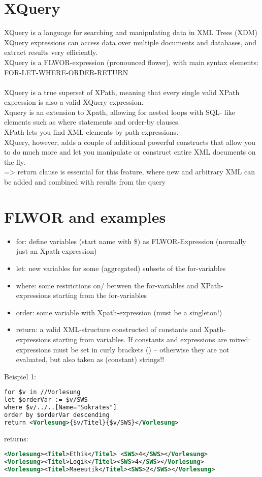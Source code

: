 \section{XQuery}
XQuery is a language for searching and manipulating data in XML Trees (XDM)\\
XQuery expressions can access data over multiple documents and databases, and extract results very efficiently.\\
XQuery is a FLWOR-expression (pronounced flower), with main syntax elements:\\FOR-LET-WHERE-ORDER-RETURN\\
\\
XQuery is a true superset of XPath, meaning that every single valid
XPath expression is also a valid XQuery expression.\\
Xquery is an extension to Xpath, allowing for nested loops with SQL- like elements such as where statements and order-by clauses.\\
XPath lets you find XML elements by path expressions.\\
XQuery, however, adds a couple of additional powerful constructs that allow you to do much more and let you manipulate or construct entire XML documents on the fly.\\
  => return clause is essential for this feature, where new and arbitrary XML can be added and combined with results from the query

\section{FLWOR and examples}

\begin{itemize}
  \item for: define variables (start name with \$) as FLWOR-Expression
(normally just an Xpath-expression)
  \item let: new variables for some (aggregated) subsets of the for-variables
  \item where: some restrictions on/ between the for-variables and XPath- expressions starting from the for-variables
  \item order: some variable with Xpath-expression (must be a singleton!)
  \item return: a valid XML-structure constructed of constants and Xpath- expressions starting from variables. If constants and expressions are mixed: expressions must be set in curly brackets ({}) – otherwise they are not evaluated, but also taken as (constant) strings!!
\end{itemize}
Beispiel 1:
\begin{lstlisting}[language=XML]
for $v in //Vorlesung
let $orderVar := $v/SWS
where $v/../..[Name="Sokrates"]
order by $orderVar descending
return <Vorlesung>{$v/Titel}{$v/SWS}</Vorlesung>
\end{lstlisting}
returns:
\begin{lstlisting}[language=XML]
<Vorlesung><Titel>Ethik</Titel> <SWS>4</SWS></Vorlesung>
<Vorlesung><Titel>Logik</Titel><SWS>4</SWS></Vorlesung>
<Vorlesung><Titel>Maeeutik</Titel><SWS>2</SWS></Vorlesung>
\end{lstlisting}
